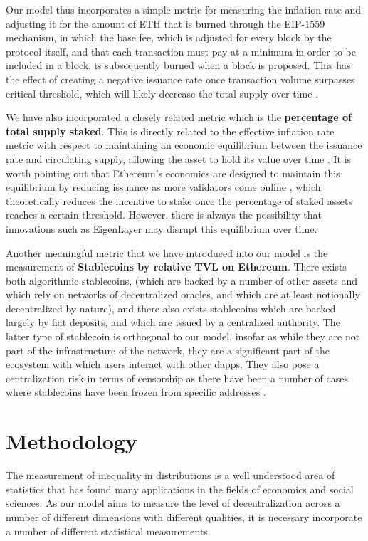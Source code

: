 \documentclass[conference]{IEEEtran}
\begin{document}
Our model thus incorporates a simple metric for measuring the inflation rate and adjusting it for the amount of ETH that is burned through the EIP-1559 mechanism, in which the base fee, which is adjusted for every block by the protocol itself, and that each transaction must pay at a minimum in order to be included in a block, is subsequently burned when a block is proposed.  This has the effect of  creating a negative issuance rate once transaction volume surpasses critical threshold, which will likely decrease the total supply over time \cite{liu2022empirical}.

We have also incorporated a closely related metric which is the \textbf{percentage of total supply staked}.  This is directly related to the effective inflation rate metric with respect to maintaining an economic equilibrium between the issuance rate and circulating supply, allowing the asset to hold its value over time \cite{john2021equilibrium}.  It is worth pointing out that Ethereum's economics are designed to maintain this equilibrium by reducing issuance as more validators come online \cite{edgington2023}, which theoretically reduces the incentive to stake once the percentage of staked assets reaches a certain threshold. However, there is always the possibility that innovations such as EigenLayer may disrupt this equilibrium over time.

Another meaningful metric that we have introduced into our model is the measurement of \textbf{Stablecoins by relative TVL on Ethereum}.  There exists both algorithmic stablecoins, (which are backed by a number of other assets and which rely on networks of decentralized oracles, and which are at least notionally decentralized by nature), and there also exists stablecoins which are backed largely by fiat deposits, and which are issued by a centralized authority.  The latter type of stablecoin is orthogonal to our model, insofar as while they are not part of the infrastructure of the network, they are a significant part of the ecosystem with which users interact with other dapps.  They also pose a centralization risk in terms of censorship as there have been a number of  cases where stablecoins have been frozen from specific addresses \cite{wall2021}.

\section{Methodology}

The measurement of inequality in distributions is a well understood area of statistics that has found many applications in the fields of economics and social sciences. As our model aims to measure the level of decentralization across a number of different dimensions with different qualities, it is necessary incorporate a number of different statistical measurements.
\end{document}
